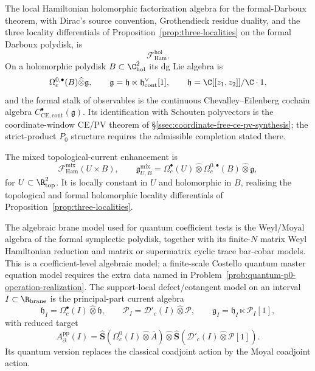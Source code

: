\documentclass[11pt]{memoir}
\begin{document}
\begin{defn}\label{def:local-hamiltonian-chiral-factorization-algebra}
  The local Hamiltonian holomorphic factorization algebra for the
  formal-Darboux theorem, with Dirac's source convention, Grothendieck residue
  duality, and the three locality differentials of
  Proposition~\ref{prop:three-localities} on the formal Darboux
  polydisk, is
  \[
    \mathcal F_{\mathrm{Ham}}^{\mathrm{hol}}.
  \]
  On a holomorphic polydisk
  \(B\subset\C^2_{\mathrm{hol}}\) its dg Lie algebra is
  \[
    \Omega_c^{0,\bullet}(B)\widehat\otimes\mathfrak g,\qquad
    \mathfrak g=\mathfrak h\ltimes
      \mathfrak h^\vee_{\mathrm{cont}}[1],\qquad
    \mathfrak h=\C[[z_1,z_2]]/\C\cdot1,
  \]
  and the formal stalk of observables is the continuous Chevalley--Eilenberg
  cochain algebra \(C^\bullet_{\mathrm{CE},\mathrm{cont}}(\mathfrak g)\).
  Its identification with Schouten polyvectors is the coordinate-window
  CE/PV theorem of \S\ref{ssec:coordinate-free-ce-pv-synthesis}; the
  strict-product \(P_0\) structure requires the admissible completion
  stated there.

  The mixed topological-current enhancement is
  \[
    \mathcal F_{\mathrm{Ham}}^{\mathrm{mix}}(U\times B),
    \qquad
    \mathfrak g^{\mathrm{mix}}_{U,B}
      =
      \Omega_c^\bullet(U)\widehat\otimes
      \Omega_c^{0,\bullet}(B)\widehat\otimes\mathfrak g ,
  \]
  for \(U\subset\R^2_{\mathrm{top}}\).  It is locally constant
  in \(U\) and holomorphic in \(B\), realising the topological and formal
  holomorphic locality differentials of Proposition~\ref{prop:three-localities}.

  The algebraic brane model used for quantum coefficient tests is the
  Weyl/Moyal algebra of the formal symplectic polydisk, together with its
  finite-\(N\) matrix Weyl Hamiltonian reduction and matrix or supermatrix
  cyclic trace bar-cobar models.  This is a coefficient-level
  algebraic model; a finite-scale Costello quantum master equation
  model requires the extra data named in
  Problem~\ref{prob:quantum-p0-operation-realization}.  The
  support-local defect/cotangent model on an
  interval \(I\subset\R_{\mathrm{brane}}\) is the principal-part current
  algebra
  \[
    \mathfrak h_I=\Omega^\bullet_c(I)\widehat\otimes\mathfrak h,\qquad
    \mathcal P_I=\mathcal D'_c(I)\widehat\otimes\mathcal P,\qquad
    \mathfrak g_I=\mathfrak h_I\ltimes\mathcal P_I[1],
  \]
  with reduced target
  \[
    A^{\mathrm{pp}}_\partial(I)
      =
      \widehat{\mathbf S}(\Omega_c^0(I)\widehat\otimes\bar A)
      \widehat\otimes
      \widehat{\mathbf S}(\mathcal D'_c(I)\widehat\otimes\mathcal P[1]).
  \]
  Its quantum version replaces the classical coadjoint action by the
  Moyal coadjoint action.


\end{defn}
\end{document}
